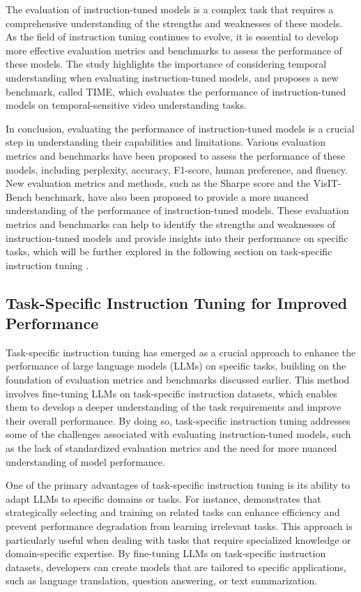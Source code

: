 \documentclass[11pt]{article}
\begin{document}
The evaluation of instruction-tuned models is a complex task that requires a comprehensive understanding of the strengths and weaknesses of these models. As the field of instruction tuning continues to evolve, it is essential to develop more effective evaluation metrics and benchmarks to assess the performance of these models. The study \cite{ref87} highlights the importance of considering temporal understanding when evaluating instruction-tuned models, and proposes a new benchmark, called TIME, which evaluates the performance of instruction-tuned models on temporal-sensitive video understanding tasks.

In conclusion, evaluating the performance of instruction-tuned models is a crucial step in understanding their capabilities and limitations. Various evaluation metrics and benchmarks have been proposed to assess the performance of these models, including perplexity, accuracy, F1-score, human preference, and fluency. New evaluation metrics and methods, such as the Sharpe score and the VisIT-Bench benchmark, have also been proposed to provide a more nuanced understanding of the performance of instruction-tuned models. These evaluation metrics and benchmarks can help to identify the strengths and weaknesses of instruction-tuned models and provide insights into their performance on specific tasks, which will be further explored in the following section on task-specific instruction tuning \cite{ref16}.

\subsection{Task-Specific Instruction Tuning for Improved Performance}

Task-specific instruction tuning has emerged as a crucial approach to enhance the performance of large language models (LLMs) on specific tasks, building on the foundation of evaluation metrics and benchmarks discussed earlier. This method involves fine-tuning LLMs on task-specific instruction datasets, which enables them to develop a deeper understanding of the task requirements and improve their overall performance. By doing so, task-specific instruction tuning addresses some of the challenges associated with evaluating instruction-tuned models, such as the lack of standardized evaluation metrics and the need for more nuanced understanding of model performance.

One of the primary advantages of task-specific instruction tuning is its ability to adapt LLMs to specific domains or tasks. For instance, \cite{ref24} demonstrates that strategically selecting and training on related tasks can enhance efficiency and prevent performance degradation from learning irrelevant tasks. This approach is particularly useful when dealing with tasks that require specialized knowledge or domain-specific expertise. By fine-tuning LLMs on task-specific instruction datasets, developers can create models that are tailored to specific applications, such as language translation, question answering, or text summarization.
\end{document}
